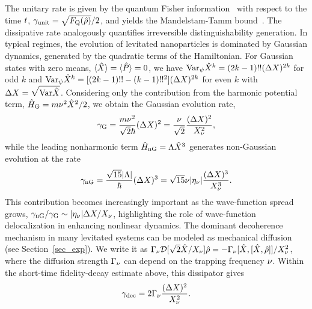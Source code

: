 \documentclass[reprint,prx,footinbib,floatfix,twocolumn,longbibliography,superscriptaddress]{revtex4-2}
\begin{document}
The unitary rate is given by the quantum Fisher information~\cite{Braunstein1994} with respect to the time $t$, $\gamma_\text{unit} = \sqrt{F_\text{Q}(\hat{\rho})}/2$, and yields the Mandelstam-Tamm bound~\cite{Mandelstam1945}.
The dissipative rate analogously quantifies irreversible distinguishability generation.
In typical regimes, the evolution of levitated nanoparticles is dominated by Gaussian dynamics, generated by the quadratic terms of the Hamiltonian.
For Gaussian states with zero means, $\langle \hat{X} \rangle = \langle \hat{P} \rangle = 0$, we have $\text{Var}_{\psi} \hat{X}^k = (2k-1)!! (\Delta X)^{2k}$ for odd $k$ and $\text{Var}_{\psi} \hat{X}^k = [(2k-1)!! - (k-1)!!^2](\Delta X)^{2k}$ for even $k$ with $\Delta X = \sqrt{\text{Var} \hat{X}}$.
Considering only the contribution from the harmonic potential term, $\hat{H}_\text{G} = m \nu^2 \hat{X}^2/ 2$, we obtain the Gaussian evolution rate,
\begin{align}
    \gamma_{\text{G}} = \frac{ m \nu^2 }{\sqrt{2}\hbar }(\Delta X)^2  = \frac{\nu}{\sqrt{2}}  \frac{(\Delta X)^2}{ X_{\nu}^2},
\end{align}
while the leading nonharmonic term $\hat{H}_\text{nG} = \Lambda \hat{X}^3$ generates non-Gaussian evolution at the rate
\begin{align}
    \gamma_{\text{nG}} = \frac{\sqrt{15}|\Lambda |}{\hbar} (\Delta X)^3  = \sqrt{15} \nu  |\eta_{\nu}|  \frac{(\Delta X)^3}{   X_{\nu}^3 }.
\end{align}
This contribution becomes increasingly important as the wave-function spread grows, $\gamma_{\text{nG}} / \gamma_{\text{G}} \sim |\eta_{\nu}| \Delta X / X_{\nu}$, highlighting the role of wave-function delocalization in enhancing nonlinear dynamics.
The dominant decoherence mechanism in many levitated systems can be modeled as mechanical diffusion (see Section~\ref{sec_exp}).
We write it as $\Gamma_{\nu} \mathcal{D}[\sqrt{2}\hat{X} / X_{\nu}]\hat{\rho} = - \Gamma_{\nu}  [\hat{X},[\hat{X},\hat{\rho}]]/X_{\nu}^2$, where the diffusion strength $\Gamma_{\nu}$ can depend on the trapping frequency ${\nu}$.
Within the short-time fidelity-decay estimate above, this dissipator gives
\begin{align}
    \gamma_{\text{dec}} = 2 \Gamma_{\nu} \frac{(\Delta X)^2}{ X_{\nu}^2}. 
\end{align}
\end{document}
